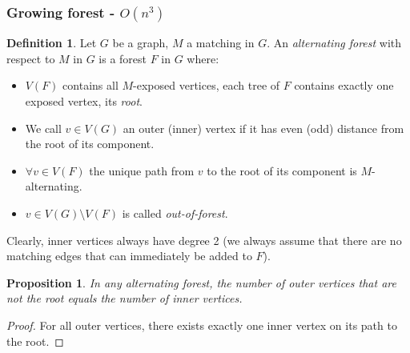 \documentclass[11pt, a4paper]{article}
\newtheorem{prop}[theorem]{Proposition}
\theoremstyle{remark}
\theoremstyle{definition}
\newtheorem{definition}[theorem]{Definition}
\begin{document}
\subsubsection{Growing forest\texorpdfstring{ - $O(n^3)$}{}}
\begin{definition}
	Let $G$ be a graph, $M$ a matching in $G$. An \emph{alternating forest}
	with respect to $M$ in $G$ is a forest $F$ in $G$ where:
	\begin{itemize}
		\item $V(F)$ contains all $M$-exposed vertices, each tree of $F$
		contains exactly one exposed vertex, its \emph{root}.
		\item We call $v\in V(G)$ an outer (inner) vertex if it has even (odd)
		distance from the root of its component.
		\item $\forall v\in V(F)$ the unique path from $v$ to the root of
		its component is $M$-alternating.
		\item $v\in V(G)\setminus V(F)$ is called \emph{out-of-forest}.
	\end{itemize}
	Clearly, inner vertices always have degree 2 (we always assume that there
	are no matching edges that can immediately be added to $F$).
\end{definition}

\begin{prop}
	In any alternating forest, the number of outer vertices that are not the
	root equals the number of inner vertices.
\end{prop}
\begin{proof}
	For all outer vertices, there exists exactly one inner vertex on its path
	to the root.
\end{proof}
\end{document}
